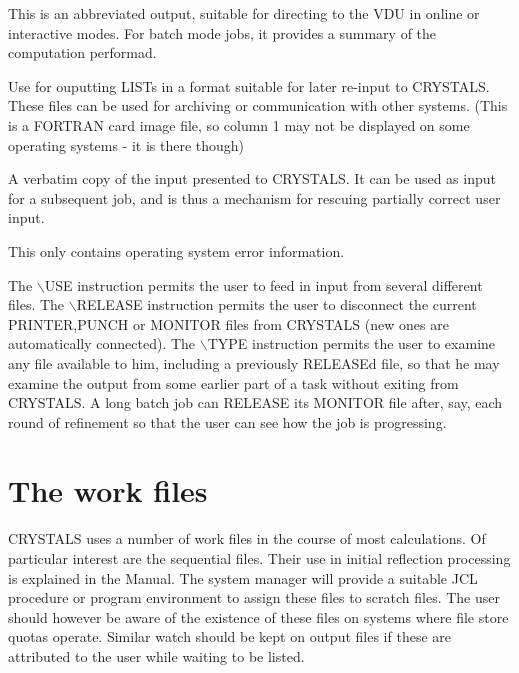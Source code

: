 \documentclass[10pt,a4paper]{report}
\begin{document}
This is an abbreviated output, suitable for directing to the VDU in online
 or interactive modes. For batch mode jobs, it provides a summary of the
 computation performad.


\bigskip{}




Use for ouputting LISTs in a format suitable for later re-input to CRYSTALS.
 These files can be used for archiving or communication with other systems.
 (This is a FORTRAN card image file, so column 1 may not be displayed on
 some operating systems - it is there though)


\bigskip{}




A verbatim copy of the input presented to CRYSTALS. It can be used as 
 input for a subsequent job, and is thus a mechanism for rescuing partially
 correct user input.


\bigskip{}




This only contains operating system error information.





The $\backslash$USE instruction permits the user to feed in input from several
 different files. The $\backslash$RELEASE instruction permits the user to disconnect
 the current PRINTER,PUNCH or MONITOR files from CRYSTALS (new ones are
 automatically connected). The $\backslash$TYPE instruction permits the user to
 examine any file available to him, including a previously RELEASEd file,
 so that he may examine the output from some earlier part of a task without
 exiting from CRYSTALS. A long batch job can RELEASE its MONITOR file
 after, say, each round of refinement so that the user can see how the job
 is progressing. 
\section{The work files}


 


CRYSTALS uses a number of work files in the course of most calculations. Of
 particular interest are the sequential files. Their use in initial reflection processing is explained in
 the Manual. The system manager will provide a
 suitable JCL procedure 
 or program environment to assign these files to scratch files. The user
 should however be aware of the existence of these files on systems where
 file store quotas operate. Similar watch should be kept on output files if
 these are attributed to the user while waiting to be listed.
\end{document}
